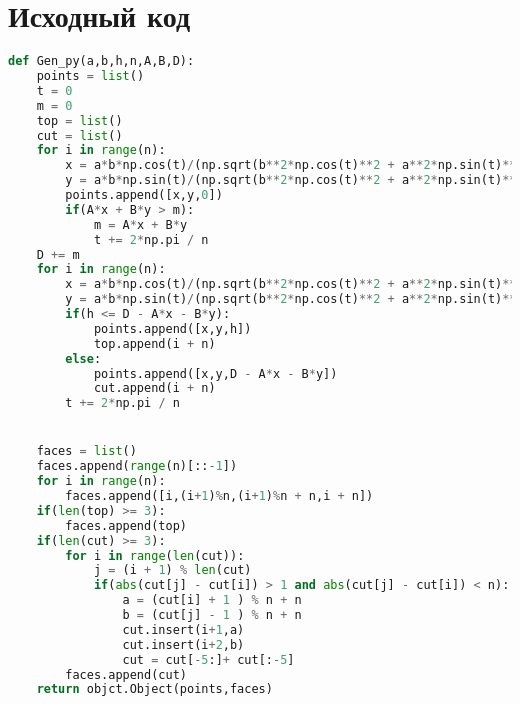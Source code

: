 \section{Исходный код}

\begin{lstlisting}[language=Python]
def Gen_py(a,b,h,n,A,B,D):
    points = list()
    t = 0
    m = 0
    top = list()
    cut = list()
    for i in range(n):
        x = a*b*np.cos(t)/(np.sqrt(b**2*np.cos(t)**2 + a**2*np.sin(t)**2))
        y = a*b*np.sin(t)/(np.sqrt(b**2*np.cos(t)**2 + a**2*np.sin(t)**2))
        points.append([x,y,0])
        if(A*x + B*y > m):
            m = A*x + B*y
            t += 2*np.pi / n
    D += m
    for i in range(n):
        x = a*b*np.cos(t)/(np.sqrt(b**2*np.cos(t)**2 + a**2*np.sin(t)**2))
        y = a*b*np.sin(t)/(np.sqrt(b**2*np.cos(t)**2 + a**2*np.sin(t)**2))
        if(h <= D - A*x - B*y):
            points.append([x,y,h])
            top.append(i + n)
        else:
            points.append([x,y,D - A*x - B*y])
            cut.append(i + n)
        t += 2*np.pi / n


    faces = list()
    faces.append(range(n)[::-1])
    for i in range(n):
        faces.append([i,(i+1)%n,(i+1)%n + n,i + n])
    if(len(top) >= 3):
        faces.append(top)
    if(len(cut) >= 3):
        for i in range(len(cut)):
            j = (i + 1) % len(cut)
            if(abs(cut[j] - cut[i]) > 1 and abs(cut[j] - cut[i]) < n):
                a = (cut[i] + 1 ) % n + n
                b = (cut[j] - 1 ) % n + n
                cut.insert(i+1,a)
                cut.insert(i+2,b)
                cut = cut[-5:]+ cut[:-5]
        faces.append(cut)
    return objct.Object(points,faces)
\end{lstlisting}




